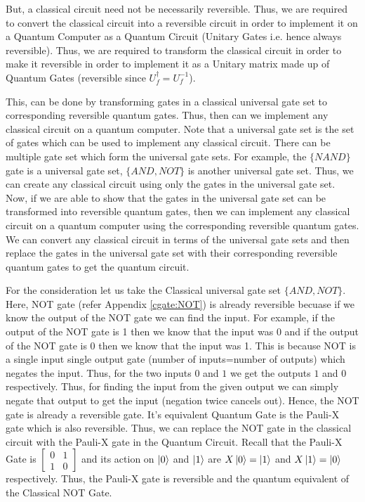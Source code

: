 But, a classical circuit need not be necessarily reversible. Thus, we are required to convert the classical circuit into a reversible circuit in order to implement it on a Quantum Computer as a Quantum Circuit (Unitary Gates i.e. hence always reversible).
Thus, we are required to transform the classical circuit in order to make it reversible in order to implement it as a Unitary matrix made up of Quantum Gates (reversible since $U_f^{\dagger}=U_f^{-1}$).

This, can be done by transforming gates in a classical universal gate set to corresponding reversible quantum gates. Thus, then can we implement any classical circuit on a quantum computer. 
Note that a universal gate set is the set of gates which can be used to implement any classical circuit. There can be multiple gate set which form the universal gate sets. For example, the $\{NAND\}$ gate is a universal gate set,
$\{AND, NOT\}$ is another universal gate set. Thus, we can create any classical circuit using only the gates in the universal gate set. Now, if we are able to show that 
the gates in the universal gate set can be transformed into reversible quantum gates, then we can implement any classical circuit on a quantum computer using the corresponding reversible quantum gates. We can convert any classical circuit in terms of the universal gate sets and then 
replace the gates in the universal gate set with their corresponding reversible quantum gates to get the quantum circuit.

For the consideration let us take the Classical universal gate set $\{AND,NOT\}$. Here, NOT gate (refer Appendix \ref{cgate:NOT}) is already reversible 
becuase if we know the output of the NOT gate we can find the input. For example, if the output of the NOT gate is 1 then we know that the input was 0 and if the output of the NOT gate is 0 then we know that the input was 1. This is because NOT is a single input single output gate (number of inputs=number of outputs)
which negates the input. Thus, for the two inputs $0$ and $1$ we get the outputs $1$ and $0$ respectively. Thus, for finding the input from the given output we can simply negate that output to get the input (negation twice cancels out). Hence, the NOT gate is already a reversible gate. 
It's equivalent Quantum Gate is the Pauli-X gate which is also reversible. Thus, we can replace the NOT gate in the classical circuit with the Pauli-X gate in the Quantum Circuit.
Recall that the Pauli-X Gate is $\begin{bmatrix} 0 & 1 \\ 1 & 0 \end{bmatrix}$ and its action on $\ket{0}$ and $\ket{1}$ are $X\ket{0}=\ket{1}$ and $X\ket{1}=\ket{0}$
respectively. Thus, the Pauli-X gate is reversible and the quantum equivalent of the Classical NOT Gate.

